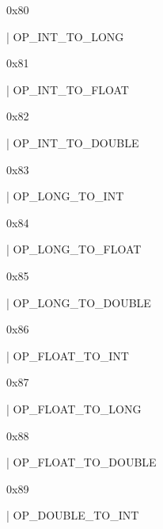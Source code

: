 \documentclass[11pt]{article}
\begin{document}
\begin{ocamldoccomment}
0x80
\end{ocamldoccomment}
\begin{ocamldoccode}
  | OP_INT_TO_LONG
\end{ocamldoccode}
\begin{ocamldoccomment}
0x81
\end{ocamldoccomment}
\begin{ocamldoccode}
  | OP_INT_TO_FLOAT
\end{ocamldoccode}
\begin{ocamldoccomment}
0x82
\end{ocamldoccomment}
\begin{ocamldoccode}
  | OP_INT_TO_DOUBLE
\end{ocamldoccode}
\begin{ocamldoccomment}
0x83
\end{ocamldoccomment}
\begin{ocamldoccode}
  | OP_LONG_TO_INT
\end{ocamldoccode}
\begin{ocamldoccomment}
0x84
\end{ocamldoccomment}
\begin{ocamldoccode}
  | OP_LONG_TO_FLOAT
\end{ocamldoccode}
\begin{ocamldoccomment}
0x85
\end{ocamldoccomment}
\begin{ocamldoccode}
  | OP_LONG_TO_DOUBLE
\end{ocamldoccode}
\begin{ocamldoccomment}
0x86
\end{ocamldoccomment}
\begin{ocamldoccode}
  | OP_FLOAT_TO_INT
\end{ocamldoccode}
\begin{ocamldoccomment}
0x87
\end{ocamldoccomment}
\begin{ocamldoccode}
  | OP_FLOAT_TO_LONG
\end{ocamldoccode}
\begin{ocamldoccomment}
0x88
\end{ocamldoccomment}
\begin{ocamldoccode}
  | OP_FLOAT_TO_DOUBLE
\end{ocamldoccode}
\begin{ocamldoccomment}
0x89
\end{ocamldoccomment}
\begin{ocamldoccode}
  | OP_DOUBLE_TO_INT
\end{ocamldoccode}
\end{document}
